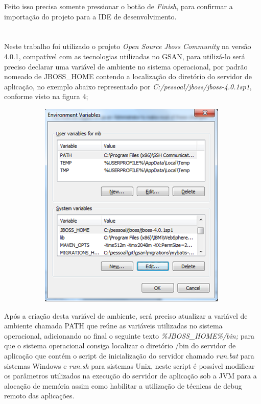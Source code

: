 \begin{apendicesenv}
Feito isso precisa somente pressionar o botão de \textit{Finish}, para confirmar a importação do projeto para a IDE de desenvolvimento.

\chapter{\fontsize{12}{1} }

Neste trabalho foi utilizado o projeto \textit{Open Source Jboss Community} na versão 4.0.1, compatível com as tecnologias utilizadas no GSAN, para utilizá-lo será preciso declarar uma variável de ambiente no sistema operacional, por padrão nomeado de JBOSS\_HOME contendo a localização do diretório do servidor de aplicação, no exemplo abaixo representado por \textit{C:/pessoal/jboss/jboss-4.0.1sp1}, conforme visto na figura 4;

\begin{figure}[H]
	\centering
	\caption*{\textbf{\fontsize{12}{1}\selectfont{Figura 4 - Adicionando variável de ambiente JBOSS\_HOME.}}}
	\label{figura:anexo4}
	\begin{subfigure}[H]{\textwidth}
		\centering
		\includegraphics{figuras/anexo/var_JBOSS_HOME.png}
	\end{subfigure}
\end{figure}


Após a criação desta variável de ambiente, será preciso atualizar a variável de ambiente chamada PATH que reúne as variáveis utilizadas no sistema operacional, adicionando ao final o seguinte texto \textit{\%JBOSS\_HOME\%/bin;} para que o sistema operacional consiga localizar o diretório /bin do servidor de aplicação que contém o script de inicialização do servidor chamado \textit{run.bat} para sistemas Windows e \textit{run.sh} para sistemas Unix, neste script é possível modificar os parâmetros utilizados na execução do servidor de aplicação sob a JVM para a alocação de memória assim como habilitar a utilização de técnicas de debug remoto das aplicações.



\end{apendicesenv}

